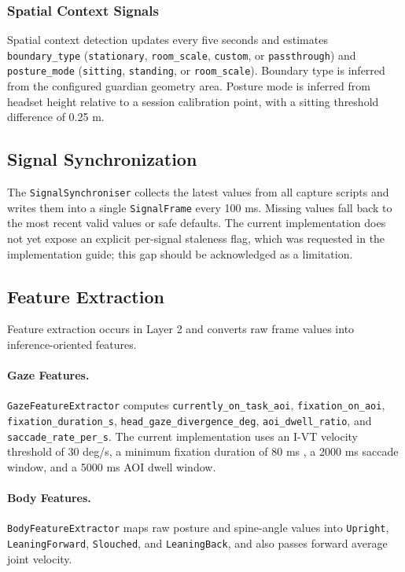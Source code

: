 \documentclass[10pt,twocolumn]{article}
\begin{document}
\subsubsection{Spatial Context Signals}
Spatial context detection updates every five seconds and estimates \texttt{boundary\_type} (\texttt{stationary}, \texttt{room\_scale}, \texttt{custom}, or \texttt{passthrough}) and \texttt{posture\_mode} (\texttt{sitting}, \texttt{standing}, or \texttt{room\_scale}). Boundary type is inferred from the configured guardian geometry area. Posture mode is inferred from headset height relative to a session calibration point, with a sitting threshold difference of 0.25 m.

\subsection{Signal Synchronization}
The \texttt{SignalSynchroniser} collects the latest values from all capture scripts and writes them into a single \texttt{SignalFrame} every 100 ms. Missing values fall back to the most recent valid values or safe defaults. The current implementation does not yet expose an explicit per-signal staleness flag, which was requested in the implementation guide; this gap should be acknowledged as a limitation.

\subsection{Feature Extraction}
Feature extraction occurs in Layer 2 and converts raw frame values into inference-oriented features.

\paragraph{Gaze Features.}
\texttt{GazeFeatureExtractor} computes \texttt{currently\_on\_task\_aoi}, \texttt{fixation\_on\_aoi}, \texttt{fixation\_duration\_s}, \texttt{head\_gaze\_divergence\_deg}, \texttt{aoi\_dwell\_ratio}, and \texttt{saccade\_rate\_per\_s}. The current implementation uses an I-VT velocity threshold of 30 deg/s, a minimum fixation duration of 80 ms \cite{salvucci2000}, a 2000 ms saccade window, and a 5000 ms AOI dwell window.

\paragraph{Body Features.}
\texttt{BodyFeatureExtractor} maps raw posture and spine-angle values into \texttt{Upright}, \texttt{LeaningForward}, \texttt{Slouched}, and \texttt{LeaningBack}, and also passes forward average joint velocity.
\end{document}
